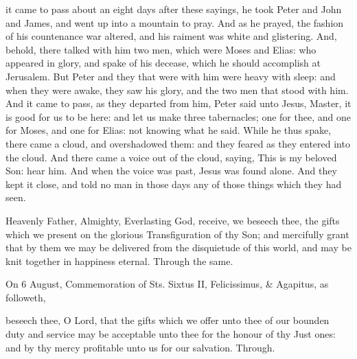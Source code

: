  it came to pass about an eight days after these sayings, he took Peter and John and James, and went up into a mountain to pray. And as he prayed, the fashion of his countenance war altered, and his raiment was white and glistering. And, behold, there talked with him two men, which were Moses and Elias: who appeared in glory, and spake of his decease, which he should accomplish at Jerusalem. But Peter and they that were with him were heavy with sleep: and when they were awake, they saw his glory, and the two men that stood with him. And it came to pass, as they departed from him, Peter said unto Jesus, Master, it is good for us to be here: and let us make three tabernacles; one for thee, and one for Moses, and one for Elias: not knowing what he said. While he thus spake, there came a cloud, and overshadowed them: and they feared as they entered into the cloud. And there came a voice out of the cloud, saying, This is my beloved Son: hear him. And when the voice was past, Jesus was found alone. And they kept it close, and told no man in those days any of those things which they had seen.


\secret
{} Heavenly Father, Almighty, Everlasting God, receive, we beseech thee, the gifts which we present on the glorious Transfiguration of thy Son; and mercifully grant that by them we may be delivered from the disquietude of this world, and may be knit together in happiness eternal. Through the same.
\begin{rubric}
	 On 6 August, Commemoration {of Sts. Sixtus II, Felicissimus, \& Agapitus,} as followeth,
\end{rubric}
 beseech thee, O Lord, that the gifts which we offer unto thee of our bounden duty and service may be acceptable unto thee for the honour of thy Just ones: and by thy mercy profitable unto us for our salvation. Through.

